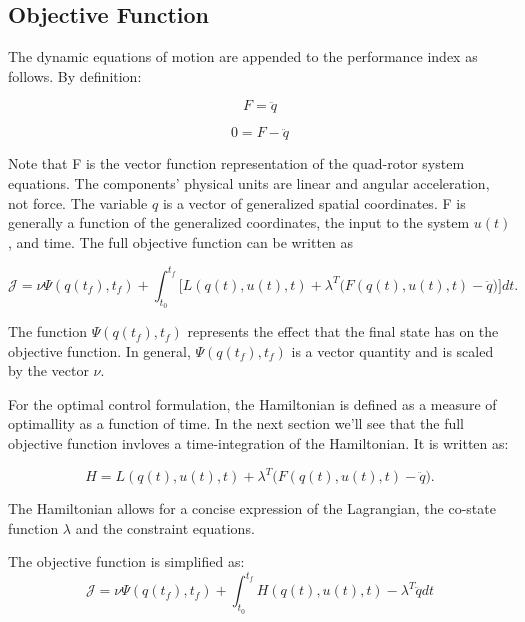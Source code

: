 \subsection{Objective Function}

The dynamic equations of motion are appended to the performance index as follows. By definition:

\begin{equation}
     F = \ddot{q}
\end{equation}

\begin{equation}
    0 = F - \ddot{q}
\end{equation}

Note that F is the vector function representation of the quad-rotor system equations. The components' physical units are linear and angular acceleration, not force. The variable $q$ is a vector of generalized spatial coordinates. F is generally a function of the generalized coordinates, the input to the system $u(t)$, and time. The full objective function can be written as


\begin{equation}
    \mathcal{  J  } = \nu \Psi ( q(t_f),t_f ) + \int_{t_0}^{t_f}  \big[ L(q(t),u(t),t) + \lambda^T \big( F(q(t),u(t),t) - \ddot q \big)  \big] dt .
\end{equation}

The function $\Psi ( q(t_f),t_f )$ represents the effect that the final state has on the objective function. In general, $\Psi( q(t_f),t_f )$ is a vector quantity and is scaled by the vector $\nu$.

For the optimal control formulation, the Hamiltonian is defined as a measure of optimallity as a function of time. In the next section we'll see that the full objective function invloves a time-integration of the Hamiltonian. It is written as:

\begin{equation}
    H = L(q(t),u(t),t) + \lambda^T \big( F(q(t),u(t),t) - \ddot q\big).
\end{equation}

The Hamiltonian allows for a concise expression of the Lagrangian, the co-state function $\lambda$ and the constraint equations.

The objective function is simplified as:\\

\begin{equation}
    \mathcal{  J  } = \nu \Psi ( q(t_f),t_f ) + \int_{t_0}^{t_f}  H(q(t),u(t),t) - \lambda^T \ddot q  dt
\end{equation}

